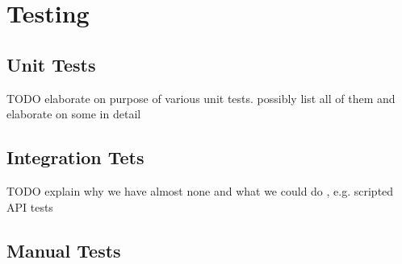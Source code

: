 \section{Testing}

\subsection{Unit Tests}

TODO elaborate on purpose of various unit tests.
possibly list all of them and elaborate on some in detail

\subsection{Integration Tets}

TODO explain why we have almost none and what we could do
, e.g. scripted API tests

\subsection{Manual Tests}

